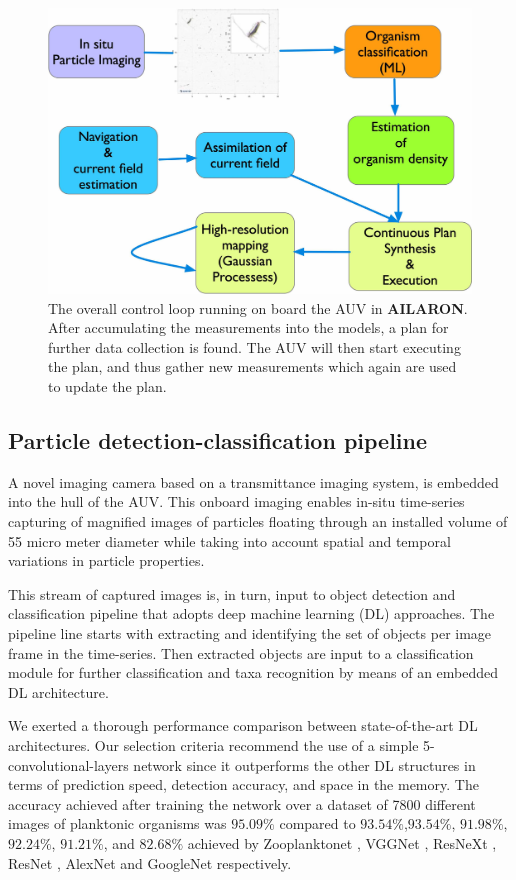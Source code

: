 \documentclass[conference]{IEEEtran}
\def\proje{{\textbf{AILARON}}}
\begin{document}
\begin{figure}[tbp]
\centerline{\includegraphics[width=0.8\linewidth]{figures/workflow-simplified.jpg}}
\caption{The overall control loop running on board the AUV in \proje. After accumulating the measurements into the models, a plan for further data collection is found. The AUV will then start executing the plan, and thus gather new measurements which again are used to update the plan.}
\label{fig:sensePlanActLoop}
\end{figure}

\subsection{Particle detection-classification pipeline}

A novel imaging camera \cite{Davies2017a} based on a transmittance
imaging system, is embedded into the hull of the AUV. This onboard
imaging enables in-situ time-series capturing of magnified images of
particles floating through an installed volume of 55 micro meter
diameter while taking into account spatial and temporal variations in
particle properties.

This stream of captured images is, in turn, input to object detection and classification pipeline that adopts deep machine learning (DL) approaches. The pipeline line starts with extracting and identifying the set of objects per image frame in the time-series. Then extracted objects are input to a classification module for further classification and taxa recognition by means of an embedded DL architecture. 

We exerted a thorough performance comparison between state-of-the-art DL architectures. Our selection criteria recommend the use of a simple 5-convolutional-layers network since it outperforms the other DL structures in terms of prediction speed, detection accuracy, and space in the memory. The accuracy achieved after training the network over a dataset of 7800 different images of planktonic organisms was $95.09\%$ compared to $93.54\%$,$93.54\%$, $91.98\%$, $92.24\%$, $91.21\%$, and $82.68\%$ achieved by Zooplanktonet \cite{dai2016zooplanktonet}, VGGNet \cite{simonyan2014very}, ResNeXt \cite{xie2017aggregated}, ResNet  \cite{he2016deep}, AlexNet \cite{krizhevsky2012imagenet} and GoogleNet  \cite{szegedy2015going} respectively. 
\end{document}
